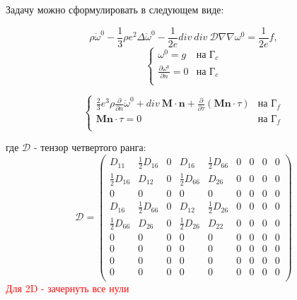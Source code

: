 \documentclass[a4paper,12pt]{article}
\begin{document}
Задачу можно сформулировать в следующем виде:

        
\begin{equation}
\rho\ddot{\omega}^0 - \frac{1}{3}\rho e^2\Delta\ddot{\omega}^0 - \frac{1}{2e}div \: div \: \mathcal{D}\nabla \nabla \omega^0 = \frac{1}{2e}f,
\end{equation}
\begin{equation}
\begin{cases}
    \omega^0 = g & \text{на $\text{Г}_c$}  \\
    \frac{\partial\omega^0}{\partial n} = 0 & \text{на $\text{Г}_c$} \\
\end{cases}
\end{equation}

\begin{equation}
\begin{cases}
    \frac{2}{3}e^3\rho \frac{\partial}{\partial n} \ddot{\omega}^0  + div  \: \textbf{M} \cdot \textbf{n} + \frac{\partial}{\partial \tau}(\textbf{Mn} \cdot\tau)& \text{на $\text{Г}_f$} \\
     \textbf{Mn}\cdot \tau= 0 & \text{на $\text{Г}_f$} \\
\end{cases}
\end{equation}

где $\mathcal{D}$ - тензор четвертого ранга:
\begin{equation}
\mathcal{D} = 
\begin{pmatrix}
    D_{11} & \frac{1}{2}D_{16} & 0 &  D_{16} & \frac{1}{2}D_{66} &0 &0 &0 & 0 \\
    \frac{1}{2}D_{16} & D_{12} & 0 & \frac{1}{2}D_{66} & D_{26} & 0 & 0&0 &0 \\
    0&0&0&0&0&0&0&0&0\\
    D_{16} & \frac{1}{2}D_{66} & 0 & D_{12} & \frac{1}{2}D_{26} & 0 &0 &0&0 \\
    \frac{1}{2}D_{66} & D_{26} & 0 & \frac{1}{2}D_{26} & D_{22} & 0 &0 &0&0 \\
    0&0 &0 &0 &0 &0 &0 &0 &0 \\
    0&0 &0 &0 &0 &0 &0 &0 &0 \\
    0&0 &0 &0 &0 &0 &0 &0 &0 \\
    0&0 &0 &0 &0 &0 &0 &0 &0 \\
    
\end{pmatrix}
\end{equation}
\textcolor{red}{ Для 2D - зачернуть все нули}
\end{document}
